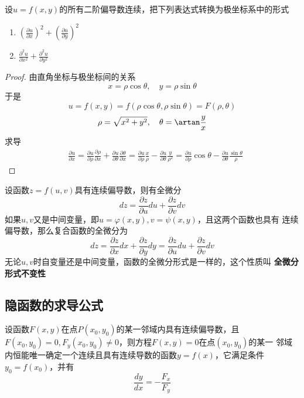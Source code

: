 \documentclass[11pt]{article}
\begin{document}
\begin{proposition}[]
设\(u=f(x,y)\)的所有二阶偏导数连续，把下列表达式转换为极坐标系中的形式
\begin{enumerate}
\item \((\frac{\partial u}{\partial x})^2+(\frac{\partial u}{\partial y})^2\)
\item \(\frac{\partial^2u}{\partial x^2}+\frac{\partial^2u}{\partial y^2}\)
\end{enumerate}
\end{proposition}

\begin{proof}
由直角坐标与极坐标间的关系
\begin{equation*}
x=\rho\cos\theta,\quad y=\rho\sin\theta
\end{equation*}
于是
\begin{equation*}
u=f(x,y)=f(\rho\cos\theta,\rho\sin\theta)=F(\rho,\theta)
\end{equation*}
\begin{equation*}
\rho=\sqrt{x^2+y^2},\quad\theta=\artan\frac{y}{x}
\end{equation*}
求导
\begin{align*}
&\frac{\partial u}{\partial x}=\frac{\partial u}{\partial \rho}\frac{\partial \rho}{\partial x}+\frac{\partial u}{\partial \theta}\frac{\partial \theta}{\partial x}=
\frac{\partial u}{\partial\rho}\frac{x}{\rho}-\frac{\partial u}{\partial \theta}\frac{y}{\rho^2}=
\frac{\partial u}{\partial \rho}\cos\theta-\frac{\partial u}{\partial \theta}\frac{\sin\theta}{\rho}
\end{align*}
\end{proof}

设函数\(z=f(u,v)\)具有连续偏导数，则有全微分
\begin{equation*}
dz=\frac{\partial z}{\partial u}du+\frac{\partial z}{\partial v}dv
\end{equation*}
如果\(u,v\)又是中间变量，即\(u=\varphi(x,y),v=\psi(x,y)\)，且这两个函数也具有
连续偏导数，那么复合函数的全微分为
\begin{equation*}
dz=\frac{\partial z}{\partial x}dx+\frac{\partial z}{\partial y}dy=\frac{\partial z}{\partial u}du+\frac{\partial z}{\partial v}dv
\end{equation*}
无论\(u,v\)时自变量还是中间变量，函数的全微分形式是一样的，这个性质叫 \textbf{全微分
形式不变性}
\subsection{隐函数的求导公式}
\label{sec:orgcb7c9c9}
\begin{theorem}
设函数\(F(x,y)\)在点\(P(x_0,y_0)\)的某一邻域内具有连续偏导数，且
\(F(x_0,y_0)=0,F_y(x_0,y_0)\neq0\)，则方程\(F(x,y)=0\)在点\((x_0,y_0)\)的某一
邻域内恒能唯一确定一个连续且具有连续导数的函数\(y=f(x)\)，它满足条件
\(y_0=f(x_0)\)，并有
\begin{equation*}
\frac{dy}{dx}=-\frac{F_x}{F_y}
\end{equation*}
\end{theorem}
\end{document}
